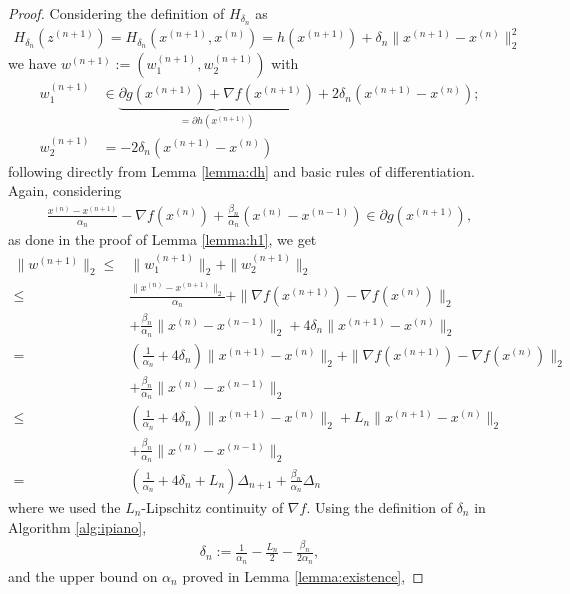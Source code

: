 \documentclass[onecolumn,final,a4paper,13pt,reqno]{siamart}
\begin{document}
\begin{proof}
	Considering the definition of $H_{\delta_n}$ as
	\begin{align}
		H_{\delta_n} (z^{(n + 1)}) = H_{\delta_n} (x^{(n + 1)}, x^{(n)}) = h(x^{(n + 1)}) + \delta_n\|x^{(n + 1)} - x^{(n)}\|_2^2
	\end{align}
	we have $w^{(n + 1)} := (w^{(n + 1)}_1, w^{(n + 1)}_2)$ with
	\begin{align}
		w^{(n + 1)}_1 &\in \underbrace{\partial g(x^{(n + 1)}) + \nabla f(x^{(n + 1)})}_{= \partial h(x^{(n + 1)})} + 2\delta_n (x^{(n + 1)} - x^{(n)});\\
		w^{(n + 1)}_2 &= -2\delta_n(x^{(n + 1)} - x^{(n)})
	\end{align}
	following directly from Lemma \ref{lemma:dh} and basic rules of differentiation. Again, considering
	\begin{align}
		\frac{x^{(n)} - x^{(n + 1)}}{\alpha_n} - \nabla f(x^{(n)}) + \frac{\beta_n}{\alpha_n}(x^{(n)} - x^{(n - 1)}) \in \partial g(x^{(n + 1)}),
	\end{align}
	as done in the proof of Lemma \ref{lemma:h1}, we get
	\begin{align}
		\|w^{(n + 1)}\|_2 \leq &\|w^{(n + 1)}_1\|_2 + \|w^{(n + 1)}_2\|_2\\
		\leq &\frac{\|x^{(n)} - x^{(n + 1)}\|_2}{\alpha_n} + \|\nabla f(x^{(n + 1)}) - \nabla f(x^{(n)})\|_2\\
		&+\frac{\beta_n}{\alpha_n} \|x^{(n)} - x^{(n - 1)}\|_2 + 4\delta_n\|x^{(n + 1)} - x^{(n)}\|_2\\
		=& \left(\frac{1}{\alpha_n} + 4\delta_n\right) \|x^{(n + 1)} - x^{(n)}\|_2 + \|\nabla f(x^{(n + 1)}) - \nabla f(x^{(n)})\|_2\\
		&+ \frac{\beta_n}{\alpha_n}\|x^{(n)} - x^{(n - 1)}\|_2\\
		\leq& \left(\frac{1}{\alpha_n} + 4\delta_n\right) \|x^{(n + 1)} - x^{(n)}\|_2 + L_n \|x^{(n + 1)} - x^{(n)}\|_2\\
		&+ \frac{\beta_n}{\alpha_n}\|x^{(n)} - x^{(n - 1)}\|_2\\
		=&\left(\frac{1}{\alpha_n} + 4\delta_n + L_n\right)\Delta_{n + 1} + \frac{\beta_n}{\alpha_n}\Delta_n
	\end{align}
	where we used the $L_n$-Lipschitz continuity of $\nabla f$. Using the definition of $\delta_n$ in Algorithm \ref{alg:ipiano},
	\begin{align}
		\delta_n := \frac{1}{\alpha_n} - \frac{L_n}{2} - \frac{\beta_n}{2\alpha_n},
	\end{align}
	and the upper bound on $\alpha_n$ proved in Lemma \ref{lemma:existence},

\end{proof}
\end{document}
